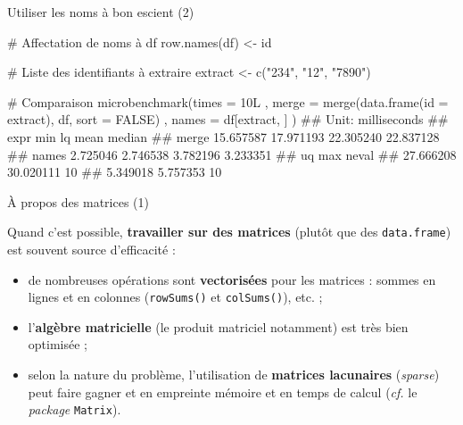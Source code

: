 \documentclass[12pt,ignorenonframetext,]{beamer}
\newenvironment{Shaded}{}{}
\newcommand{\KeywordTok}[1]{\textcolor[rgb]{0.00,0.00,1.00}{#1}}
\newcommand{\DataTypeTok}[1]{#1}
\newcommand{\StringTok}[1]{\textcolor[rgb]{0.00,0.50,0.50}{#1}}
\newcommand{\CommentTok}[1]{\textcolor[rgb]{0.00,0.50,0.00}{#1}}
\newcommand{\OtherTok}[1]{\textcolor[rgb]{1.00,0.25,0.00}{#1}}
\newcommand{\NormalTok}[1]{#1}
\providecommand{\tightlist}{%
  \setlength{\itemsep}{0pt}\setlength{\parskip}{0pt}}
\renewenvironment{Shaded}{\begin{snugshade}}{\end{snugshade}}
\begin{document}
\begin{frame}[fragile]{Utiliser les noms à bon escient (2)}

\footnotesize

\begin{Shaded}
\begin{Highlighting}[]
\CommentTok{# Affectation de noms à df }
\KeywordTok{row.names}\NormalTok{(df) <-}\StringTok{ }\NormalTok{id}

\CommentTok{# Liste des identifiants à extraire}
\NormalTok{extract <-}\StringTok{ }\KeywordTok{c}\NormalTok{(}\StringTok{"234"}\NormalTok{, }\StringTok{"12"}\NormalTok{, }\StringTok{"7890"}\NormalTok{)}

\CommentTok{# Comparaison}
\KeywordTok{microbenchmark}\NormalTok{(}\DataTypeTok{times =}\NormalTok{ 10L}
\NormalTok{  , }\DataTypeTok{merge =} \KeywordTok{merge}\NormalTok{(}\KeywordTok{data.frame}\NormalTok{(}\DataTypeTok{id =}\NormalTok{ extract), df, }\DataTypeTok{sort =} \OtherTok{FALSE}\NormalTok{)}
\NormalTok{  , }\DataTypeTok{names =}\NormalTok{ df[extract, ]}
\NormalTok{)}
\NormalTok{  ## Unit: milliseconds}
\NormalTok{  ##   expr       min        lq      mean    median}
\NormalTok{  ##  merge 15.657587 17.971193 22.305240 22.837128}
\NormalTok{  ##  names  2.725046  2.746538  3.782196  3.233351}
\NormalTok{  ##         uq       max neval}
\NormalTok{  ##  27.666208 30.020111    10}
\NormalTok{  ##   5.349018  5.757353    10}
\end{Highlighting}
\end{Shaded}

\end{frame}

\begin{frame}[fragile]{À propos des matrices (1)}

Quand c'est possible, \textbf{travailler sur des matrices} (plutôt que
des \texttt{data.frame}) est souvent source d'efficacité :

\vfill

\begin{itemize}
\tightlist
\item
  \pause de nombreuses opérations sont \textbf{vectorisées} pour les
  matrices : sommes en lignes et en colonnes (\texttt{rowSums()} et
  \texttt{colSums()}), etc. ;
\end{itemize}

\vfill 

\begin{itemize}
\tightlist
\item
  \pause l'\textbf{algèbre matricielle} (le produit matriciel notamment)
  est très bien optimisée ;
\end{itemize}

\vfill

\begin{itemize}
\tightlist
\item
  \pause selon la nature du problème, l'utilisation de \textbf{matrices
  lacunaires} (\emph{sparse}) peut faire gagner et en empreinte mémoire
  et en temps de calcul (\emph{cf.} le \emph{package} \texttt{Matrix}).
\end{itemize}

\end{frame}
\end{document}
